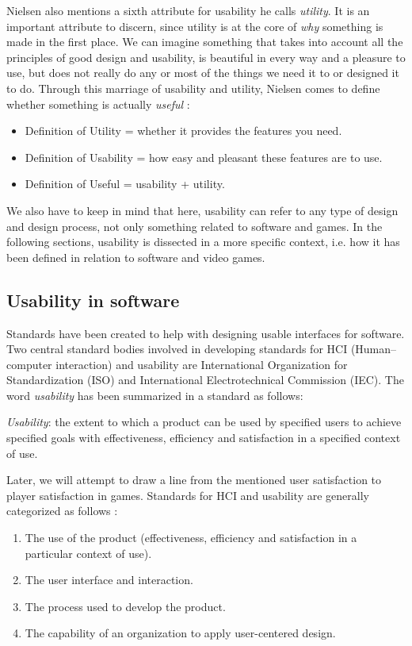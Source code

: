 Nielsen also mentions a sixth attribute for usability he calls \textit{utility}. It is an important attribute to discern, since utility is at the core of \textit{why} something is made in the first place. We can imagine something that takes into account all the principles of good design and usability, is beautiful in every way and a pleasure to use, but does not really do any or most of the things we need it to or designed it to do. Through this marriage of usability and utility, Nielsen comes to define whether something is actually \textit{useful} \cite{Nielsen2012}: 

\begin{itemize}

	\item Definition of Utility = whether it provides the features you need.
	\item Definition of Usability = how easy and pleasant these features are to use.
	\item Definition of Useful = usability + utility.

\end{itemize}

We also have to keep in mind that here, usability can refer to any type of design and design process, not only something related to software and games. In the following sections, usability is dissected in a more specific context, i.e. how it has been defined in relation to software and video games.

\subsection{Usability in software}
Standards have been created to help with designing usable interfaces for software. Two central standard bodies involved in developing standards for HCI (Human--computer interaction) and usability are International Organization for Standardization (ISO) and International Electrotechnical Commission (IEC). The word \textit{usability} has been summarized in a standard as follows:

\begin{displayquote}

\textit{Usability}: the extent to which a product can be used by specified users to achieve specified goals with effectiveness, efficiency and satisfaction in a specified context of use. \cite{ISO1998}

\end{displayquote}

Later, we will attempt to draw a line from the mentioned user satisfaction to player satisfaction in games. Standards for HCI and usability are generally categorized as follows \cite{Bevan2006}:
\begin{enumerate}
	\item The use of the product (effectiveness, efficiency and satisfaction in a particular context of use).
	\item The user interface and interaction.
	\item The process used to develop the product.
	\item The capability of an organization to apply user-centered design.
\end{enumerate}


